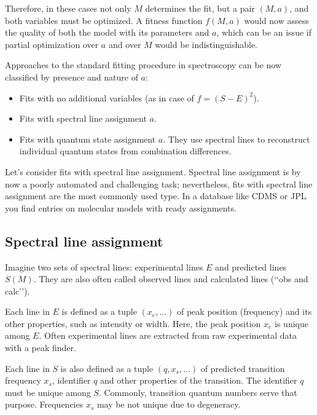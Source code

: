 \documentclass[11pt]{article}
\begin{document}
Therefore, in these cases not only $M$ determines the fit, but a pair $(M, a)$, and both variables must be optimized. A fitness function $f(M, a)$ would now assess the quality of both the model with its parameters and $a$, which can be an issue if partial optimization over $a$ and over $M$ would be indistinguishable. %

Approaches to the standard fitting procedure in spectroscopy can be now classified by presence and nature of $a$:
\begin{itemize}
	\item Fits with no additional variables (as in case of $f = (S - E)^2$). 
	\item Fits with spectral line assignment $a$.
	\item Fits with quantum state assignment $a$. They use spectral lines to reconstruct individual quantum states from combination differences.
\end{itemize}

Let's consider fits with spectral line assignment. Spectral line assignment is by now a poorly automated and challenging task; nevertheless, fits with spectral line assignment are the most commonly used type. In a database like CDMS or JPL you find entries on molecular models with ready assignments.

\subsection{Spectral line assignment}


Imagine two sets of spectral lines: experimental lines $E$ and predicted lines $S(M)$. They are also often called observed lines and calculated lines (\lq\lq{}obs and calc\rq\rq{}). 

Each  line in $E$ is defined as a tuple $(x_e, ...)$ of peak position (frequency) and its other properties, such as intensity or width. Here, the peak position $x_e$ is unique among $E$. Often experimental lines are extracted from raw experimental data with a peak finder.

Each line in $S$ is also defined as a tuple $(q, x_s, ...)$ of predicted transition frequency $x_s$, identifier $q$ and other properties of the transition. The identifier $q$ must be unique among $S$. Commonly, transition quantum numbers serve that purpose. Frequencies $x_s$ may be not unique due to degeneracy. 
\end{document}
